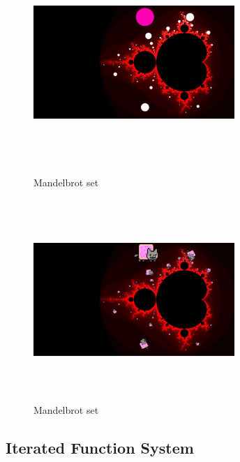 \begin{figure}[htbp]
 \begin{minipage}{0.49\hsize}
  \begin{center}
   \includegraphics[width=3in, height=3in, keepaspectratio]{../img/fractal/mandelbrot-orbit.pdf}
    \caption{Mandelbrot set}
    \label{fig:mandelbrotOrbit}
  \end{center}
 \end{minipage}
 \begin{minipage}{0.49\hsize}
  \begin{center}
   \includegraphics[width=3in, height=3in, keepaspectratio]{../img/fractal/mandelbrot-bitmap.pdf}
   \caption{Mandelbrot set}
   \label{fig:mandelbrotBitmap}
  \end{center}
 \end{minipage}
\end{figure}

\subsection{Iterated Function System}

